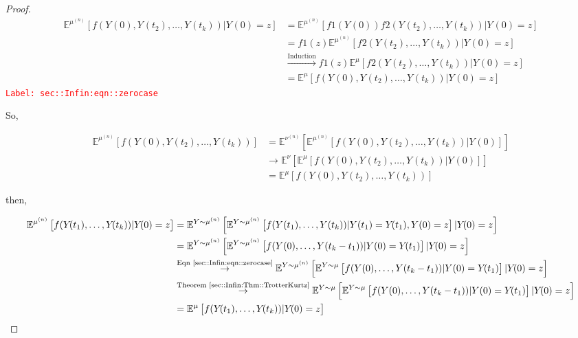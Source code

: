 \documentclass[12pt]{article}
\newcommand{\mb}{\mathbb}
\newcommand{\ra}{\rightarrow}
\newcommand{\os}{\overset}
\newcommand{\te}{\text}
\newcommand{\tr}{\textcolor{red}}
\newcommand{\labe}[1]{\tr{\texttt{Label: #1}}}
\newcommand{\exmu}[2]{\mb{E}^{#1}\left[#2\right]}	%
\renewcommand{\t}{t}							%
\newcommand{\cind}[1]{_{#1}}					%
\newcommand{\tp}[1]{(#1)}						%
\newcommand{\sln}[1]{^{(#1)}}					%
\newcommand{\indx}[1]{_{#1}}					%
\newcommand{\m}{\mu}							%
\newcommand{\mm}{\nu}							%
\newcommand{\XX}{Y}								%
\renewcommand{\it}{k}							%
\newcommand{\xxx}{z}							%
\begin{document}
\begin{proof}
\begin{align}
\exmu{\m\sln{n}}{f(\XX\cind{}\tp{0},\XX\cind{}\tp{\t\indx{2}},\dots,\XX\cind{}\tp{\t\indx{\it}})|\XX\cind{}\tp{0} = \xxx}&= \exmu{\m\sln{n}}{f{1}(\XX\cind{}\tp{0})f{2}(\XX\cind{}\tp{\t\indx{2}},\dots,\XX\cind{}\tp{\t\indx{k}})|\XX\cind{}\tp{0}=\xxx}\nonumber\\
&= f{1}(\xxx)\exmu{\m\sln{n}}{f{2}(\XX\cind{}\tp{\t\indx{2}},\dots,\XX\cind{}\tp{\t\indx{k}})|\XX\cind{}\tp{0}=\xxx}\nonumber\\
&\os{\te{Induction}}{\ra} f{1}(\xxx)\exmu{\m}{f{2}(\XX\cind{}\tp{\t\indx{2}},\dots,\XX\cind{}\tp{\t\indx{k}})|\XX\cind{}\tp{0}=\xxx}\nonumber\\
&= \exmu{\m}{f(\XX\cind{}\tp{0},\XX\cind{}\tp{\t\indx{2}},\dots,\XX\cind{}\tp{\t\indx{\it}})|\XX\cind{}\tp{0}=\xxx}
\label{sec::Infin:eqn::zerocase}
\end{align}
\labe{sec::Infin:eqn::zerocase}

So,

\begin{align*}
\exmu{\m\sln{n}}{f(\XX\cind{}\tp{0},\XX\cind{}\tp{\t\indx{2}},\dots,\XX\cind{}\tp{\t\indx{\it}})} &= \exmu{\mm\sln{n}}{\exmu{\m\sln{n}}{f(\XX\cind{}\tp{0},\XX\cind{}\tp{\t\indx{2}},\dots,\XX\cind{}\tp{\t\indx{\it}})|\XX\cind{}\tp{0}}}\\
&\ra \exmu{\mm}{\exmu{\m}{f(\XX\cind{}\tp{0},\XX\cind{}\tp{\t\indx{2}},\dots,\XX\cind{}\tp{\t\indx{\it}})|\XX\cind{}\tp{0}}}\\
&= \exmu{\m}{f(\XX\cind{}\tp{0},\XX\cind{}\tp{\t\indx{2}},\dots,\XX\cind{}\tp{\t\indx{\it}})}
\end{align*}

then,

\begin{align*}
\exmu{\m\sln{n}}{f(\XX\cind{}\tp{\t\indx{1}},\dots,\XX\cind{}\tp{\t\indx{\it}})|\XX\cind{}\tp{0}=\xxx}&=\exmu{\XX\sim\m\sln{n}}{\exmu{\XX\sim \m\sln{n}}{f(\XX\tp{\t\indx{1}},\dots,\XX\tp{\t\indx{\it}})|\XX\tp{\t\indx{1}}=\XX\cind{}\tp{\t\indx{1}},\XX\tp{0}=\xxx}|\XX\cind{}\tp{0}=\xxx}\\
&=\exmu{\XX\sim\m\sln{n}}{\exmu{\XX\sim \m\sln{n}}{f(\XX\tp{0},\dots,\XX\tp{\t\indx{\it}-\t\indx{1}})|\XX\tp{0}=\XX\cind{}\tp{\t\indx{1}}}|\XX\cind{}\tp{0}=\xxx}\\
&\os{\te{Eqn \eqref{sec::Infin:eqn::zerocase}}}{\ra} \exmu{\XX\sim\m\sln{n}}{\exmu{\XX\sim \m}{f(\XX\tp{0},\dots,\XX\tp{\t\indx{\it}-\t\indx{1}})|\XX\tp{0}=\XX\cind{}\tp{\t\indx{1}}}|\XX\cind{}\tp{0}=\xxx}\\
&\os{\te{Theorem \ref{sec::Infin:Thm::TrotterKurtz}}}{\ra} \exmu{\XX\sim\m}{\exmu{\XX\sim \m}{f(\XX\tp{0},\dots,\XX\tp{\t\indx{\it}-\t\indx{1}})|\XX\tp{0}=\XX\cind{}\tp{\t\indx{1}}}|\XX\cind{}\tp{0}=\xxx}\\
&=\exmu{\m}{f(\XX\cind{}\tp{\t\indx{1}},\dots,\XX\cind{}\tp{\t\indx{\it}})|\XX\cind{}\tp{0}=\xxx}
\end{align*}


\end{proof}
\end{document}
